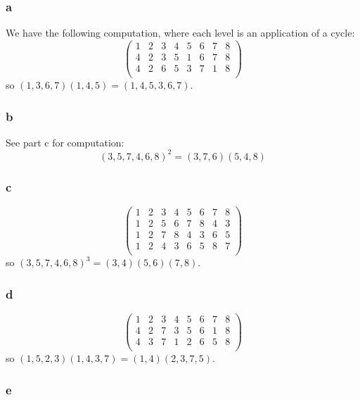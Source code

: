 \documentclass[12pt,letterpaper]{article}
\theoremstyle{definition}
\begin{document}
\subsubsection*{a}

We have the following computation, where each level is an application of a cycle:
\[
  \begin{pmatrix}
    1 & 2 & 3 & 4 & 5 & 6 & 7 & 8 \\
    4 & 2 & 3 & 5 & 1 & 6 & 7 & 8 \\
    4 & 2 & 6 & 5 & 3 & 7 & 1 & 8 \\
  \end{pmatrix}
\]
so $(1,3,6,7)(1,4,5) = (1,4,5,3,6,7)$.

\subsubsection*{b}

See part c for computation:
\[
  (3,5,7,4,6,8)^{2} = (3,7,6)(5,4,8)
\]


\subsubsection*{c}

\[
  \begin{pmatrix}
    1 & 2 & 3 & 4 & 5 & 6 & 7 & 8 \\
    1 & 2 & 5 & 6 & 7 & 8 & 4 & 3 \\
    1 & 2 & 7 & 8 & 4 & 3 & 6 & 5 \\
    1 & 2 & 4 & 3 & 6 & 5 & 8 & 7 \\
  \end{pmatrix}
\]
so $(3,5,7,4,6,8)^{3} = (3,4)(5,6)(7,8)$.

\subsubsection*{d}

\[
  \begin{pmatrix}
    1 & 2 & 3 & 4 & 5 & 6 & 7 & 8 \\
    4 & 2 & 7 & 3 & 5 & 6 & 1 & 8 \\
    4 & 3 & 7 & 1 & 2 & 6 & 5 & 8 \\
  \end{pmatrix}
\]
so $(1,5,2,3)(1,4,3,7) = (1,4)(2,3,7,5)$.

\subsubsection*{e}
\end{document}
